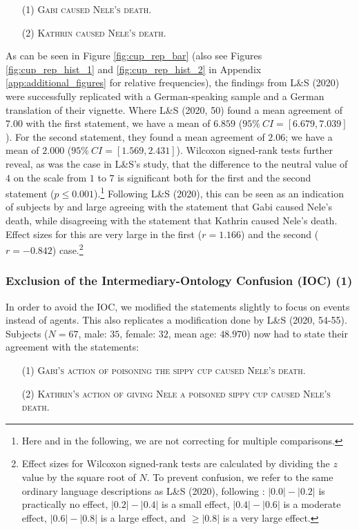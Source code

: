 \documentclass[egregdoesnotlikesansseriftitles,12pt]{scrartcl}
\begin{document}
\begin{itemize}
   \item[(1)]\textsc{Gabi caused Nele's death.}
   \item[(2)]\textsc{Kathrin caused Nele's death.}
\end{itemize}

\noindent As can be seen in Figure \ref{fig:cup_rep_bar} (also see Figures \ref{fig:cup_rep_hist_1} and \ref{fig:cup_rep_hist_2} in Appendix \ref{app:additional_figures} for relative frequencies), the findings from L\&S (2020) were successfully replicated with a German-speaking sample and a German translation of their vignette. Where L\&S (2020, 50) found a mean agreement of $7.00$ with the first statement, we have a mean of $6.859$ ($95\%~CI=[6.679,7.039]$). For the second statement, they found a mean agreement of $2.06$; we have a mean of $2.000$ ($95\%~CI=[1.569,2.431]$). Wilcoxon signed-rank tests further reveal, as was the case in L\&S's study, that the difference to the neutral value of $4$ on the scale from $1$ to $7$ is significant both for the first and the second statement ($p \leq 0.001$).\footnote{Here and in the following, we are not correcting for multiple comparisons.} Following L\&S (2020), this can be seen as an indication of subjects by and large agreeing with the statement that Gabi caused Nele's death, while disagreeing with the statement that Kathrin caused Nele's death. Effect sizes for this are very large in the first ($r=1.166$) and the second ($r=-0.842$) case.\footnote{Effect sizes for Wilcoxon signed-rank tests are calculated by dividing the $z$ value by the square root of $N$. To prevent confusion, we refer to the same ordinary language descriptions as L\&S (2020), following \citet{mcgraw_common_1992}: $|0.0|-|0.2|$ is practically no effect, $|0.2|-|0.4|$ is a small effect, $|0.4|-|0.6|$ is a moderate effect, $|0.6|-|0.8|$ is a large effect, and $\geq |0.8|$ is a very large effect.}

\subsubsection{Exclusion of the Intermediary-Ontology Confusion (IOC) (1)}\label{sec:results_cup_ioc_1}
In order to avoid the IOC, we modified the statements slightly to focus on events instead of agents. This also replicates a modification done by L\&S (2020, 54-55). Subjects ($N=67$, male: $35$, female: $32$, mean age: $48.970$) now had to state their agreement with the statements:

\begin{itemize}
   \item[(1)]\textsc{Gabi's action of poisoning the sippy cup caused Nele's death.}
   \item[(2)]\textsc{Kathrin's action of giving Nele a poisoned sippy cup caused Nele's death.}
\end{itemize}
\end{document}
